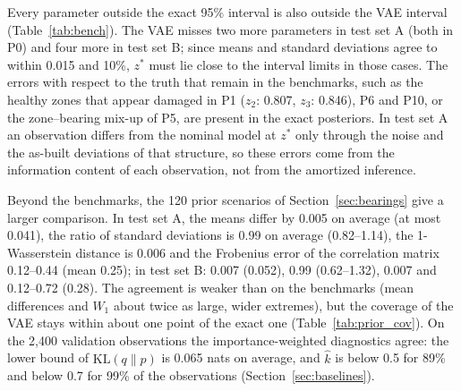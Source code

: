 \documentclass[11pt]{article}
\begin{document}
Every parameter outside the exact 95\% interval is also outside the VAE interval (Table~\ref{tab:bench}). The VAE
misses two more parameters in test set A (both in P0) and four more in test set B; since means and standard
deviations agree to within 0.015 and 10\%, $z^*$ must lie close to the interval limits in those cases. The errors with
respect to the truth that remain in the benchmarks, such as the healthy zones that appear damaged in P1 ($z_2$:
0.807, $z_3$: 0.846), P6 and P10, or the zone--bearing mix-up of P5, are present in the exact posteriors. In test set
A an observation differs from the nominal model at $z^*$ only through the noise and the as-built deviations of that
structure, so these errors come from the information content of each observation, not from the amortized inference.

Beyond the benchmarks, the 120 prior scenarios of Section~\ref{sec:bearings} give a larger comparison. In test set A,
the means differ by 0.005 on average (at most 0.041), the ratio of standard deviations is 0.99 on average (0.82--1.14),
the 1-Wasserstein distance is 0.006 and the Frobenius error of the correlation matrix 0.12--0.44 (mean 0.25); in test
set B: 0.007 (0.052), 0.99 (0.62--1.32), 0.007 and 0.12--0.72 (0.28). The agreement is weaker than on the
benchmarks (mean differences and $W_1$ about twice as large, wider extremes), but the coverage of the VAE stays within
about one point of the exact one (Table~\ref{tab:prior_cov}).
On the 2,400 validation observations the importance-weighted diagnostics agree: the lower bound of $\mathrm{KL}(q\|p)$
is 0.065 nats on average, and $\hat k$ is below 0.5 for 89\% and below 0.7 for 99\% of the observations
(Section~\ref{sec:baselines}).
\end{document}
